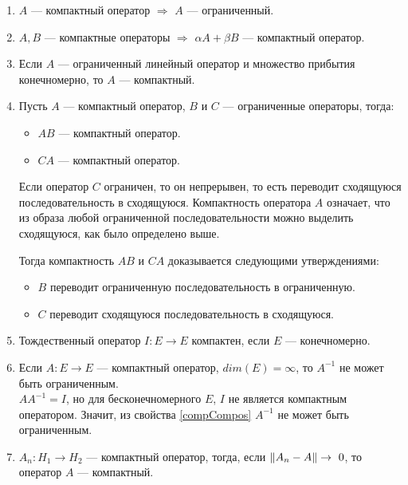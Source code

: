 \documentclass[12pt]{article}
\begin{document}
			\begin{enumerate}
				\item $A$ --- компактный оператор $\Rightarrow$ $A$ --- ограниченный.		
				\item $A, B$ --- компактные операторы $\Rightarrow$ $\alpha A + \beta B$ --- компактный оператор.		
				\item Если $A$ --- ограниченный линейный оператор и множество прибытия конечномерно, то $A$ --- компактный. \label{compArea}
				\item Пусть $A$ --- компактный оператор, $B$ и $C$ --- ограниченные операторы, тогда: \label{compCompos}
					\begin{itemize}
						\item $AB$ --- компактный оператор.
						\item $CA$ --- компактный оператор.
					\end{itemize}
		
					Если оператор $C$ ограничен, то он непрерывен, то есть переводит сходящуюся последовательность 
					в сходящуюся. Компактность оператора $A$ означает, что из образа любой ограниченной 
					последовательности можно выделить сходящуюся, как было определено выше.
		
					Тогда компактность $AB$ и $CA$ доказывается следующими утверждениями:
					\begin{itemize}
						\item $B$ переводит ограниченную последовательность в ограниченную.
						\item $C$ переводит сходящуюся последовательность в сходящуюся.
					\end{itemize}		
				\item Тождественный оператор $I:E\rightarrow E$ компактен, если $E$ --- конечномерно.
				\item Если $A:E \rightarrow E$ --- компактный оператор, $dim(E) = \infty$, то $A^{-1}$ не может быть ограниченным. \\

					$A A^{-1} = I$, но для бесконечномерного $E$, $I$ не является компактным оператором. Значит, 
					из свойства \ref{compCompos} $A^{-1}$ не может быть ограниченным.
				\item $A_n : H_1 \rightarrow H_2$ --- компактный оператор, тогда, если $\left\| A_n - A \right\| \rightarrow~0$, то 
				оператор $A$ --- компактный. \label{compLim}
		

\end{enumerate}
\end{document}
